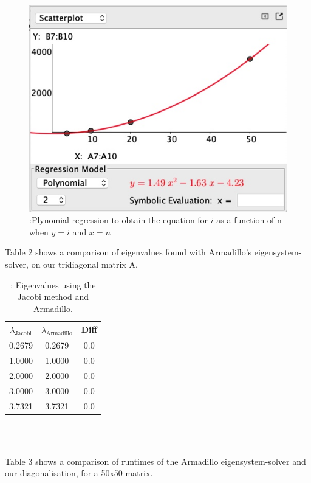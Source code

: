 \documentclass{article}
\begin{document}
	\begin{figure}[hbt]
	\begin{center}
	    \includegraphics[width=\textwidth]{bilde.jpg}
	    \caption{:Plynomial regression to obtain the equation for $i$ as a function of n when $y=i$ and $x=n$}
	    \label{fig:plot1b}
	\end{center}
	\end{figure}

	Table 2 shows a comparison of eigenvalues found with Armadillo's eigensystem-solver,
	on our tridiagonal matrix A.
	\begin{table}[h!]
		\caption{: Eigenvalues using the Jacobi method and Armadillo.}
		\begin{tabular}{c c c}
			$\lambda_{\text{Jacobi}}$ & $\lambda_{\text{Armadillo}}$ & Diff\\
			\hline
			0.2679 & 0.2679 & 0.0 \\
			1.0000 & 1.0000 & 0.0 \\
			2.0000 & 2.0000 & 0.0 \\
			3.0000 & 3.0000 & 0.0 \\
			3.7321 & 3.7321 & 0.0 \\
		\end{tabular} \\ \\
	\end{table}

	Table 3 shows a comparison of runtimes of the Armadillo eigensystem-solver and our diagonalisation,
	for a 50x50-matrix.
\end{document}
